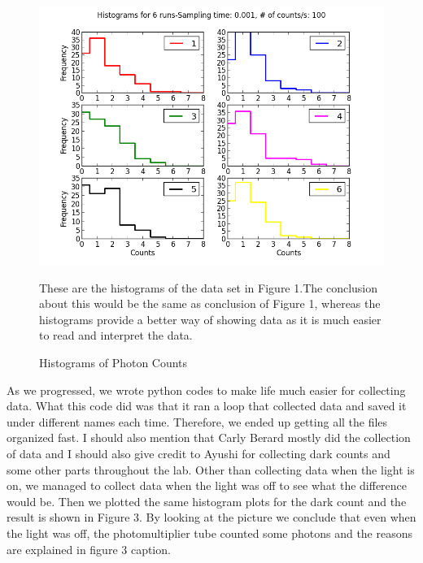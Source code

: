 \documentclass[letterpaper,12pt]{article}
\begin{document}
\begin{figure}[t]
\centering
\includegraphics[scale=0.7]{histograms.png}
\caption{Histograms of Photon Counts}
These are the histograms of the data set in Figure 1.The conclusion about this would be the same as conclusion of Figure 1, whereas the histograms provide a better way of showing data as it is much easier to read and interpret the data. 
\end{figure}

As we progressed, we wrote python codes to make life much easier for collecting data. What this code did was that it ran a loop that collected data and saved it under different names each time. Therefore, we ended up getting all the files organized fast. I should also mention that Carly Berard mostly did the collection of data and I should also give credit to Ayushi for collecting dark counts and some other parts throughout the lab. 
Other than collecting data when the light is on, we managed to collect data when the light was off to see what the difference would be. Then we plotted the same histogram plots for the dark count and the result is shown in Figure 3. By looking at the picture we conclude that even when the light was off, the photomultiplier tube counted some photons and the reasons are explained in figure 3 caption.
\end{document}

